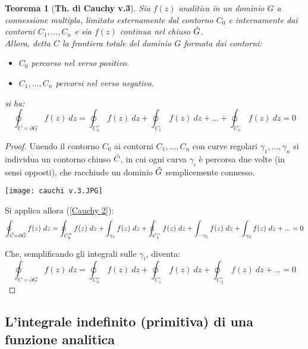 \documentclass[twoside]{article}
\newtheorem{theorem}{Teorema}[section]
\begin{document}
\begin{theorem}[\textbf{Th. di Cauchy v.3}]
Sia $f(z)$ analitica in un dominio $G$ a connessione multipla, limitato esternamente dal contorno $C_0$ e internamente dai contorni $C_1,...,C_n$ e sia $f(z)$ continua nel chiuso $\Bar{G}$.
\\
Allora, detta $C$ la frontiera totale del dominio $G$ formata dai contorni:
\begin{itemize}
    \item $C_0$ percorso nel verso positivo.
    \item $C_1,...,C_n$ percorsi nel verso negativo.
\end{itemize}
si ha:
\begin{equation}
    \oint_{C=\partial G}f(z) \ dz= \oint_{C_0 ^+}f(z) \ dz + \oint_{C_1 ^-}f(z) \ dz + ... + \oint_{C_n ^-}f(z) \ dz=0
\end{equation}
\end{theorem}

\begin{proof}
Unendo il contorno $C_0$ ai contorni $C_1,...,C_n$ con curve regolari $\gamma_1,...,\gamma_n$ si individua un contorno chiuso $\Tilde{C}$, in cui ogni curva $\gamma_i$ è percorsa due volte (in sensi opposti), che racchiude un dominio $\Tilde{G}$ semplicemente connesso. 
 \begin{center}
    \texttt{[image: cauchi v.3.JPG]}
  \end{center}

Si applica allora (\ref{Cauchy 2}):
\begin{equation}
    \oint_{\Tilde{C}=\partial \Tilde{G}}f(z) \ dz= \oint_{C_0 ^+}f(z) \ dz + \int_{\gamma_1}f(z) \ dz + \oint_{C_1 ^-}f(z) \ dz + \int_{-\gamma_1}f(z) \ dz + \int_{\gamma_2}f(z) \ dz + ... =0
\end{equation}

Che, semplificando gli integrali sulle $\gamma_i$, diventa:
\begin{equation}
    \oint_{C=\partial G}f(z) \ dz= \oint_{C_0 ^+}f(z) \ dz + \oint_{C_1 ^-}f(z) \ dz+\oint_{C_2 ^-}f(z) \ dz + ...=0
\end{equation}

\end{proof}

\subsection{L'integrale indefinito (primitiva) di una funzione analitica}
\end{document}

